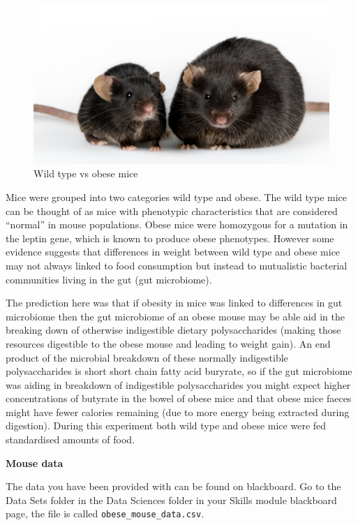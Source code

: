 \documentclass[
]{book}
\begin{document}
\begin{figure}
\includegraphics[width=0.9\linewidth]{figures/mouse} \caption{Wild type vs obese mice}\label{fig:unnamed-chunk-81}
\end{figure}

Mice were grouped into two categories wild type and obese. The wild type mice can be thought of as mice with phenotypic characteristics that are considered ``normal'' in mouse populations. Obese mice were homozygous for a mutation in the leptin gene, which is known to produce obese phenotypes. However some evidence suggests that differences in weight between wild type and obese mice may not always linked to food consumption but instead to mutualistic bacterial communities living in the gut (gut microbiome).

The prediction here was that if obesity in mice was linked to differences in gut microbiome then the gut microbiome of an obese mouse may be able aid in the breaking down of otherwise indigestible dietary polysaccharides (making those resources digestible to the obese mouse and leading to weight gain). An end product of the microbial breakdown of these normally indigestible polysaccharides is short short chain fatty acid buryrate, so if the gut microbiome was aiding in breakdown of indigestible polysaccharides you might expect higher concentrations of butyrate in the bowel of obese mice and that obese mice faeces might have fewer calories remaining (due to more energy being extracted during digestion). During this experiment both wild type and obese mice were fed standardised amounts of food.

\textbf{Mouse data}

The data you have been provided with can be found on blackboard. Go to the Data Sets folder in the Data Sciences folder in your Skills module blackboard page, the file is called \texttt{obese\_mouse\_data.csv}.
\end{document}
